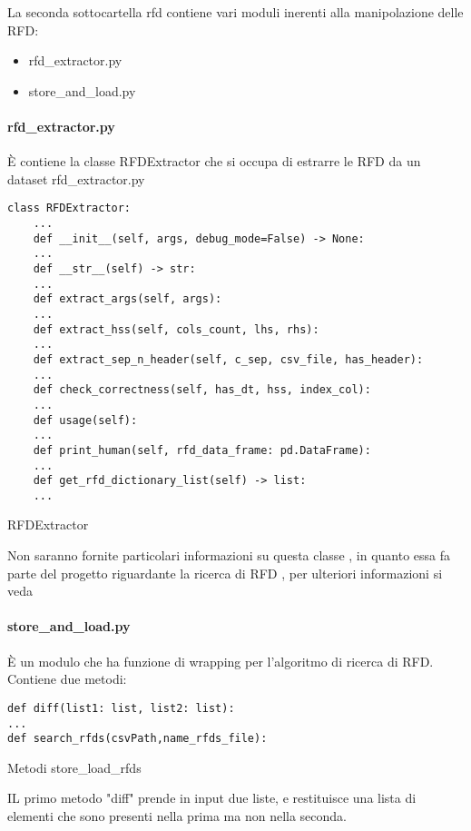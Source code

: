 La seconda sottocartella rfd contiene vari moduli inerenti alla manipolazione delle RFD:
\begin{itemize}[noitemsep]
\let\labelitemi\labelitemii
    \item rfd{\_}extractor.py
    \item store{\_}and{\_}load.py
\end{itemize}

\paragraph{rfd{\_}extractor.py}
È contiene la classe RFDExtractor che si occupa di estrarre le RFD da un dataset
rfd{\_}extractor.py
\begin{listing}[H]
\begin{verbatim}
class RFDExtractor:
    ...
    def __init__(self, args, debug_mode=False) -> None:
    ...
    def __str__(self) -> str:
    ...
    def extract_args(self, args):
    ...
    def extract_hss(self, cols_count, lhs, rhs):
    ...
    def extract_sep_n_header(self, c_sep, csv_file, has_header):
    ...
    def check_correctness(self, has_dt, hss, index_col):
    ...
    def usage(self):
    ...
    def print_human(self, rfd_data_frame: pd.DataFrame):
    ...
    def get_rfd_dictionary_list(self) -> list:
    ...
\end{verbatim}
\caption{RFDExtractor}
\label{Code:6}
\end{listing}

Non saranno fornite particolari informazioni su questa classe , in quanto essa fa parte del progetto riguardante la ricerca di RFD , per ulteriori informazioni si veda \cite{tesinaIA}

\paragraph{store{\_}and{\_}load.py}
È un modulo che ha funzione di wrapping per l'algoritmo di ricerca di RFD.
Contiene due metodi:
\begin{listing}[H]
\begin{verbatim}
def diff(list1: list, list2: list):
...
def search_rfds(csvPath,name_rfds_file):
\end{verbatim}
\caption{Metodi store{\_}load{\_}rfds}
\label{Code:7}
\end{listing}

IL primo metodo "diff" prende in input due liste, e restituisce una lista di elementi che sono presenti nella prima ma non nella seconda.

